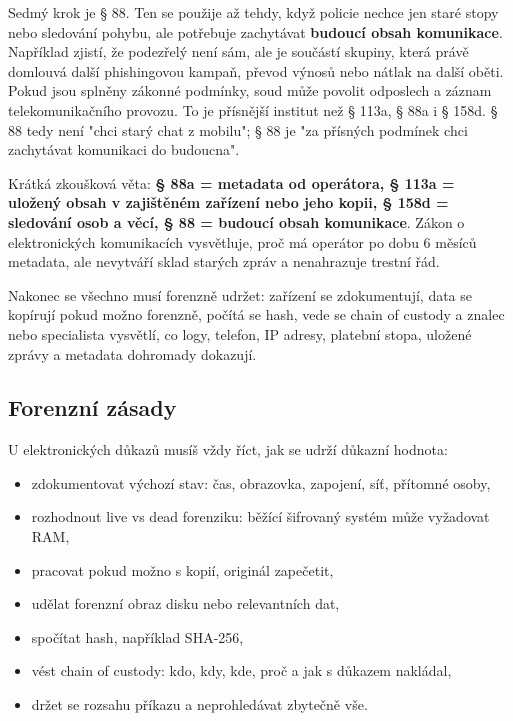 {Sedmý krok je § 88. Ten se použije až tehdy, když policie nechce jen staré stopy nebo sledování pohybu, ale potřebuje zachytávat \textbf{budoucí obsah komunikace}. Například zjistí, že podezřelý není sám, ale je součástí skupiny, která právě domlouvá další phishingovou kampaň, převod výnosů nebo nátlak na další oběti. Pokud jsou splněny zákonné podmínky, soud může povolit odposlech a záznam telekomunikačního provozu. To je přísnější institut než § 113a, § 88a i § 158d. § 88 tedy není "chci starý chat z mobilu"; § 88 je "za přísných podmínek chci zachytávat komunikaci do budoucna".

Krátká zkoušková věta: \textbf{§ 88a = metadata od operátora, § 113a = uložený obsah v zajištěném zařízení nebo jeho kopii, § 158d = sledování osob a věcí, § 88 = budoucí obsah komunikace}. Zákon o elektronických komunikacích vysvětluje, proč má operátor po dobu 6 měsíců metadata, ale nevytváří sklad starých zpráv a nenahrazuje trestní řád.

Nakonec se všechno musí forenzně udržet: zařízení se zdokumentují, data se kopírují pokud možno forenzně, počítá se hash, vede se chain of custody a znalec nebo specialista vysvětlí, co logy, telefon, IP adresy, platební stopa, uložené zprávy a metadata dohromady dokazují.}

\subsection*{Forenzní zásady}
U elektronických důkazů musíš vždy říct, jak se udrží důkazní hodnota:
\begin{itemize}
  \item zdokumentovat výchozí stav: čas, obrazovka, zapojení, síť, přítomné osoby,
  \item rozhodnout live vs dead forenziku: běžící šifrovaný systém může vyžadovat RAM,
  \item pracovat pokud možno s kopií, originál zapečetit,
  \item udělat forenzní obraz disku nebo relevantních dat,
  \item spočítat hash, například SHA-256,
  \item vést chain of custody: kdo, kdy, kde, proč a jak s důkazem nakládal,
  \item držet se rozsahu příkazu a neprohledávat zbytečně vše.
\end{itemize}


